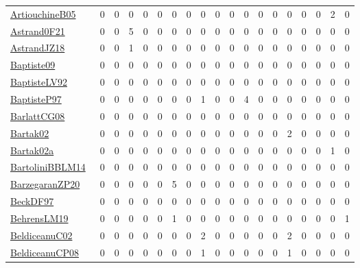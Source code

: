 {\begin{longtable}{l*{18}{r}}
\href{papers/ArtiouchineB05.pdf}{ArtiouchineB05}~\cite{ArtiouchineB05} & 0 & 0 & 0 & 0 & 0 & 0 & 0 & 0 & 0 & 0 & 0 & 0 & 0 & 0 & 0 & 0 & 2 & 0\\
\href{papers/Astrand0F21.pdf}{Astrand0F21}~\cite{Astrand0F21} & 0 & 0 & 5 & 0 & 0 & 0 & 0 & 0 & 0 & 0 & 0 & 0 & 0 & 0 & 0 & 0 & 0 & 0\\
\href{papers/AstrandJZ18.pdf}{AstrandJZ18}~\cite{AstrandJZ18} & 0 & 0 & 1 & 0 & 0 & 0 & 0 & 0 & 0 & 0 & 0 & 0 & 0 & 0 & 0 & 0 & 0 & 0\\
\href{papers/Baptiste09.pdf}{Baptiste09}~\cite{Baptiste09} & 0 & 0 & 0 & 0 & 0 & 0 & 0 & 0 & 0 & 0 & 0 & 0 & 0 & 0 & 0 & 0 & 0 & 0\\
\href{papers/BaptisteLV92.pdf}{BaptisteLV92}~\cite{BaptisteLV92} & 0 & 0 & 0 & 0 & 0 & 0 & 0 & 0 & 0 & 0 & 0 & 0 & 0 & 0 & 0 & 0 & 0 & 0\\
\href{papers/BaptisteP97.pdf}{BaptisteP97}~\cite{BaptisteP97} & 0 & 0 & 0 & 0 & 0 & 0 & 0 & 1 & 0 & 0 & 4 & 0 & 0 & 0 & 0 & 0 & 0 & 0\\
\href{papers/BarlattCG08.pdf}{BarlattCG08}~\cite{BarlattCG08} & 0 & 0 & 0 & 0 & 0 & 0 & 0 & 0 & 0 & 0 & 0 & 0 & 0 & 0 & 0 & 0 & 0 & 0\\
\href{papers/Bartak02.pdf}{Bartak02}~\cite{Bartak02} & 0 & 0 & 0 & 0 & 0 & 0 & 0 & 0 & 0 & 0 & 0 & 0 & 0 & 2 & 0 & 0 & 0 & 0\\
\href{papers/Bartak02a.pdf}{Bartak02a}~\cite{Bartak02a} & 0 & 0 & 0 & 0 & 0 & 0 & 0 & 0 & 0 & 0 & 0 & 0 & 0 & 0 & 0 & 0 & 1 & 0\\
\href{papers/BartoliniBBLM14.pdf}{BartoliniBBLM14}~\cite{BartoliniBBLM14} & 0 & 0 & 0 & 0 & 0 & 0 & 0 & 0 & 0 & 0 & 0 & 0 & 0 & 0 & 0 & 0 & 0 & 0\\
\href{papers/BarzegaranZP20.pdf}{BarzegaranZP20}~\cite{BarzegaranZP20} & 0 & 0 & 0 & 0 & 0 & 5 & 0 & 0 & 0 & 0 & 0 & 0 & 0 & 0 & 0 & 0 & 0 & 0\\
\href{papers/BeckDF97.pdf}{BeckDF97}~\cite{BeckDF97} & 0 & 0 & 0 & 0 & 0 & 0 & 0 & 0 & 0 & 0 & 0 & 0 & 0 & 0 & 0 & 0 & 0 & 0\\
\href{papers/BehrensLM19.pdf}{BehrensLM19}~\cite{BehrensLM19} & 0 & 0 & 0 & 0 & 0 & 1 & 0 & 0 & 0 & 0 & 0 & 0 & 0 & 0 & 0 & 0 & 0 & 1\\
\href{papers/BeldiceanuC02.pdf}{BeldiceanuC02}~\cite{BeldiceanuC02} & 0 & 0 & 0 & 0 & 0 & 0 & 0 & 2 & 0 & 0 & 0 & 0 & 0 & 2 & 0 & 0 & 0 & 0\\
\href{papers/BeldiceanuCP08.pdf}{BeldiceanuCP08}~\cite{BeldiceanuCP08} & 0 & 0 & 0 & 0 & 0 & 0 & 0 & 1 & 0 & 0 & 0 & 0 & 0 & 1 & 0 & 0 & 0 & 0\\

\end{longtable}}
